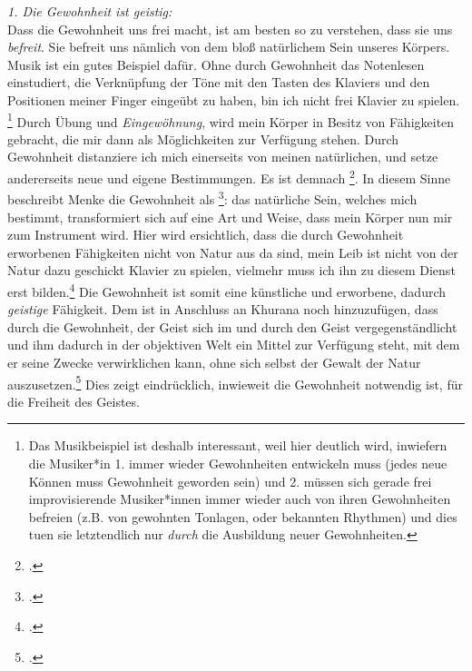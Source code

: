\documentclass[12pt, a4paper, openany]{report}
\begin{document}
\emph{1. Die Gewohnheit ist geistig:}\\
Dass die Gewohnheit uns frei macht, ist am besten so zu verstehen, dass sie uns \emph{befreit}. 
Sie befreit uns nämlich von dem bloß natürlichem Sein unseres Körpers.
Musik ist ein gutes Beispiel dafür. 
Ohne durch Gewohnheit das Notenlesen einstudiert, die Verknüpfung der Töne mit den Tasten des Klaviers und den Positionen meiner Finger eingeübt zu haben, bin ich nicht frei Klavier zu spielen.%
\footnote{
    Das Musikbeispiel ist deshalb interessant, weil hier deutlich wird, inwiefern die Musiker*in 1. immer wieder Gewohnheiten entwickeln muss (jedes neue Können muss Gewohnheit geworden sein) und 2. müssen sich gerade frei improvisierende Musiker*innen immer wieder auch von ihren Gewohnheiten befreien (z.B. von gewohnten Tonlagen, oder bekannten Rhythmen) und dies tuen sie letztendlich nur \emph{durch} die Ausbildung neuer Gewohnheiten.
}
Durch Übung und \emph{Eingewöhnung}, wird mein Körper in Besitz von Fähigkeiten gebracht, die mir dann als Möglichkeiten zur Verfügung stehen.
Durch Gewohnheit distanziere ich mich einerseits von meinen natürlichen, und setze andererseits neue und eigene Bestimmungen. 
Es ist demnach \footcite[][§410 (Anmerkung), S. 185]{hegel_enzyklopädie_1969}.
In diesem Sinne beschreibt Menke die Gewohnheit als \footcite[][130]{menke_autonomie_2018}:
das natürliche Sein, welches mich bestimmt, transformiert sich auf eine Art und Weise, dass mein Körper nun mir zum Instrument wird.
Hier wird ersichtlich, dass die durch Gewohnheit erworbenen Fähigkeiten nicht von Natur aus da sind, mein Leib ist nicht von der Natur dazu geschickt Klavier zu spielen, vielmehr muss ich ihn zu diesem Dienst erst bilden.\footcite[Vgl.][§410 Zusatz, S. 190]{hegel_enzyklopädie_1969}
Die Gewohnheit ist somit eine künstliche und erworbene, dadurch \emph{geistige} Fähigkeit.
Dem ist in Anschluss an Khurana noch hinzuzufügen, dass durch die Gewohnheit, der Geist sich im und durch den Geist vergegenständlicht und ihm dadurch in der objektiven Welt ein Mittel zur Verfügung steht, mit dem er seine Zwecke verwirklichen kann, ohne sich selbst der Gewalt der Natur auszusetzen.\footcite[Vgl.][426]{khurana_freiheit_2017}
Dies zeigt eindrücklich, inwieweit die Gewohnheit notwendig ist, für die Freiheit des Geistes.
\end{document}

